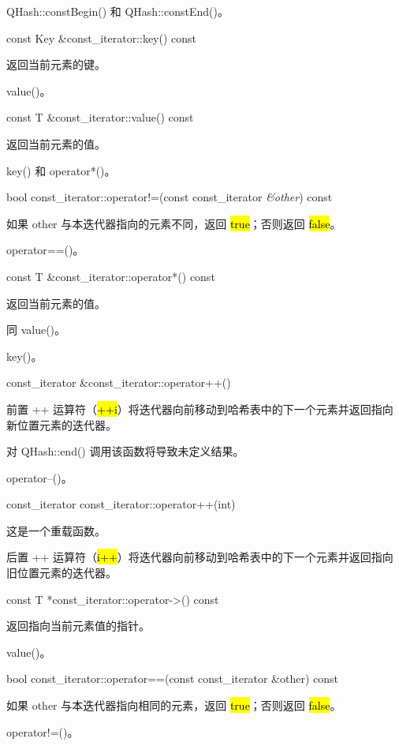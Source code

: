 \begin{seeAlso}
QHash::constBegin() 和 QHash::constEnd()。
\end{seeAlso}

const Key \&const\_iterator::key() const

返回当前元素的键。



\begin{seeAlso}
 value()。
\end{seeAlso}

const T \&const\_iterator::value() const

返回当前元素的值。



\begin{seeAlso}
 key() 和 operator*()。
\end{seeAlso}

bool const\_iterator::operator!=(const const\_iterator \emph{\&other}) const

如果 other 与本迭代器指向的元素不同，返回 \hl{true}；否则返回 \hl{false}。


\begin{seeAlso}
operator==()。
\end{seeAlso}

const T \&const\_iterator::operator*() const

返回当前元素的值。

同 value()。

\begin{seeAlso}
key()。
\end{seeAlso}


const\_iterator \&const\_iterator::operator++()

前置 ++ 运算符（\hl{++i}）将迭代器向前移动到哈希表中的下一个元素并返回指向新位置元素的迭代器。

对 QHash::end() 调用该函数将导致未定义结果。

\begin{seeAlso}
operator--()。
\end{seeAlso}

const\_iterator const\_iterator::operator++(int)

这是一个重载函数。

后置 ++ 运算符（\hl{i++}）将迭代器向前移动到哈希表中的下一个元素并返回指向
旧位置元素的迭代器。

const T *const\_iterator::operator->() const

返回指向当前元素值的指针。

\begin{seeAlso}
value()。
\end{seeAlso}

bool const\_iterator::operator==(const const\_iterator \&other) const

如果 other 与本迭代器指向相同的元素，返回 \hl{true}；否则返回 \hl{false}。

\begin{seeAlso}
operator!=()。
\end{seeAlso}
